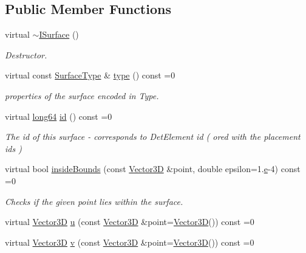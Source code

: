 \subsection*{Public Member Functions}
\begin{DoxyCompactItemize}
\item 
virtual \hyperlink{class_d_d_surfaces_1_1_i_surface_a80873dc47fb91dabae0f389de8b32055}{$\sim$\+I\+Surface} ()
\begin{DoxyCompactList}\small\item\em Destructor. \end{DoxyCompactList}\item 
virtual const \hyperlink{class_d_d_surfaces_1_1_surface_type}{Surface\+Type} \& \hyperlink{class_d_d_surfaces_1_1_i_surface_aab772d11a61d7ae966d535be0da2a626}{type} () const =0
\begin{DoxyCompactList}\small\item\em properties of the surface encoded in Type. \end{DoxyCompactList}\item 
virtual \hyperlink{namespace_d_d_surfaces_ab6b3da366f31f80aec56447ac4442e78}{long64} \hyperlink{class_d_d_surfaces_1_1_i_surface_aaf7bf967d4a0652c620ec9754a2b37c1}{id} () const =0
\begin{DoxyCompactList}\small\item\em The id of this surface -\/ corresponds to Det\+Element id ( or\textquotesingle{}ed with the placement ids ) \end{DoxyCompactList}\item 
virtual bool \hyperlink{class_d_d_surfaces_1_1_i_surface_a16aa78cb8c01cd5993b7cf23f55a7e3a}{inside\+Bounds} (const \hyperlink{class_d_d_surfaces_1_1_vector3_d}{Vector3D} \&point, double epsilon=1.\hyperlink{_volumes_8cpp_a8a9a1f93e9b09afccaec215310e64142}{e}-\/4) const =0
\begin{DoxyCompactList}\small\item\em Checks if the given point lies within the surface. \end{DoxyCompactList}\item 
virtual \hyperlink{class_d_d_surfaces_1_1_vector3_d}{Vector3D} \hyperlink{class_d_d_surfaces_1_1_i_surface_a09fd4aa43cc96d50b4b81b94107f7d8f}{u} (const \hyperlink{class_d_d_surfaces_1_1_vector3_d}{Vector3D} \&point=\hyperlink{class_d_d_surfaces_1_1_vector3_d}{Vector3D}()) const =0
\item 
virtual \hyperlink{class_d_d_surfaces_1_1_vector3_d}{Vector3D} \hyperlink{class_d_d_surfaces_1_1_i_surface_a61c9f2057ea0383b39ead13a147b2838}{v} (const \hyperlink{class_d_d_surfaces_1_1_vector3_d}{Vector3D} \&point=\hyperlink{class_d_d_surfaces_1_1_vector3_d}{Vector3D}()) const =0

\end{DoxyCompactItemize}
